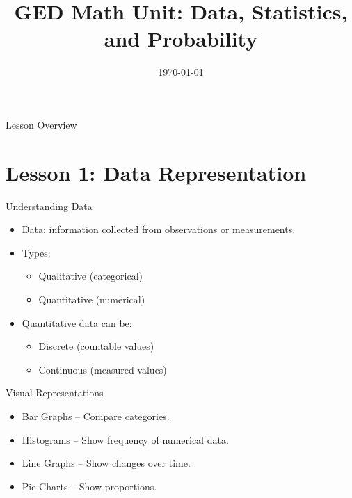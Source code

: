 \documentclass{beamer}
\title{GED Math Unit: Data, Statistics, and Probability}
\date{\today}
\begin{document}
\begin{frame}
  \titlepage
\end{frame}

\begin{frame}{Lesson Overview}
  \tableofcontents
\end{frame}


\section{Lesson 1: Data Representation}

\begin{frame}{Understanding Data}
\begin{itemize}
  \item Data: information collected from observations or measurements.
  \item Types:
  \begin{itemize}
    \item Qualitative (categorical)
    \item Quantitative (numerical)
  \end{itemize}
  \item Quantitative data can be:
  \begin{itemize}
    \item Discrete (countable values)
    \item Continuous (measured values)
  \end{itemize}
\end{itemize}
\end{frame}

\begin{frame}{Visual Representations}
  \begin{itemize}
    \item Bar Graphs -- Compare categories.
    \item Histograms -- Show frequency of numerical data.
    \item Line Graphs -- Show changes over time.
    \item Pie Charts -- Show proportions.
  \end{itemize}
  \begin{center}
  \end{center}
\end{frame}
\end{document}
